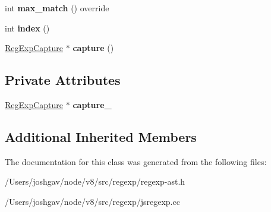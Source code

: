 \begin{DoxyCompactItemize}
\item 
int {\bfseries max\+\_\+match} () override\hypertarget{classv8_1_1internal_1_1_reg_exp_back_reference_a93c1549501adc0de419418dabd4f1e3f}{}\label{classv8_1_1internal_1_1_reg_exp_back_reference_a93c1549501adc0de419418dabd4f1e3f}

\item 
int {\bfseries index} ()\hypertarget{classv8_1_1internal_1_1_reg_exp_back_reference_ad731fce769b3b8cee0dc6f0108aa0974}{}\label{classv8_1_1internal_1_1_reg_exp_back_reference_ad731fce769b3b8cee0dc6f0108aa0974}

\item 
\hyperlink{classv8_1_1internal_1_1_reg_exp_capture}{Reg\+Exp\+Capture} $\ast$ {\bfseries capture} ()\hypertarget{classv8_1_1internal_1_1_reg_exp_back_reference_aceceec7e4a061ac9aaddceaabf3ed755}{}\label{classv8_1_1internal_1_1_reg_exp_back_reference_aceceec7e4a061ac9aaddceaabf3ed755}

\end{DoxyCompactItemize}
\subsection*{Private Attributes}
\begin{DoxyCompactItemize}
\item 
\hyperlink{classv8_1_1internal_1_1_reg_exp_capture}{Reg\+Exp\+Capture} $\ast$ {\bfseries capture\+\_\+}\hypertarget{classv8_1_1internal_1_1_reg_exp_back_reference_a643b29cbd5b45b043ecf7088f520a478}{}\label{classv8_1_1internal_1_1_reg_exp_back_reference_a643b29cbd5b45b043ecf7088f520a478}

\end{DoxyCompactItemize}
\subsection*{Additional Inherited Members}


The documentation for this class was generated from the following files\+:\begin{DoxyCompactItemize}
\item 
/\+Users/joshgav/node/v8/src/regexp/regexp-\/ast.\+h\item 
/\+Users/joshgav/node/v8/src/regexp/jsregexp.\+cc\end{DoxyCompactItemize}
